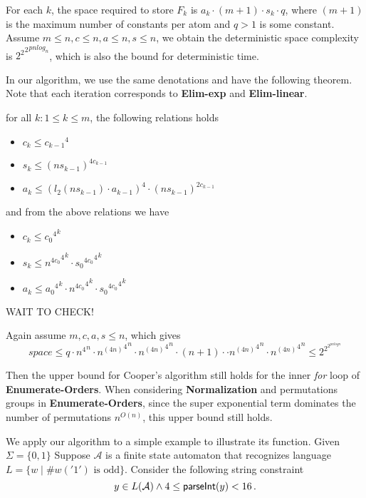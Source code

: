 For each $k$,
the space required to store $F_k$ 
is $a_k \cdot (m+1) \cdot s_k \cdot q$,
where $(m+1)$ is the maximum number of constants per atom and $q>1$ is some constant. Assume $m\le n, c\le n, a\le n, s\le n$, we obtain the deterministic space complexity is ${{2^2}^2}^{p n log_n}$, which is also the bound for deterministic time.

In our algorithm,
we use the same denotations and have the following theorem. 
Note that each iteration corresponds to \textbf{Elim-exp} and \textbf{Elim-linear}.
\begin{theorem}
for all $k: 1\le k\le m$, the following relations holds
\begin{itemize}
    \item $c_k \le {c_{k-1}}^4$
    \item $s_k \le {(n s_{k-1})}^{4c_{k-1}}$
    \item $a_k \le {{(l_2(ns_{k-1})\cdot a_{k-1})}}^4 \cdot {(n s_{k-1})}^{2c_{k-1}}$
\end{itemize}
and from the above relations we have 
\begin{itemize}
    \item $c_k \le {{c_0}^4}^k$
    \item $s_k \le {{{n}^{4c_0}}^4}^k \cdot {{{s_0}^{4c_0}}^4}^k$
    \item $a_k \le {{a_0}^4}^k \cdot 
     {{{n}^{4c_0}}^4}^k
     \cdot {{{s_0}^{4c_0}}^4}^k$
\end{itemize}
\end{theorem}

WAIT TO CHECK!

Again assume $m,c,a,s\le n$, which gives 
$$
\textit{space}\le q \cdot {n^4}^n \cdot {{n^{(4n)}}^4}^n \cdot
{{n^{(4n)}}^4}^n \cdot (n+1) \cdot 
\cdot {{n^{(4n)}}^4}^n \cdot {{n^{(4n)}}^4}^n
\le 2^{2^{2^{p n \textit{log}n}}}
$$

Then the upper bound for Cooper's algorithm still holds for the inner \textit{for} loop of \textbf{Enumerate-Orders}.
When considering \textbf{Normalization} and permutations groups in \textbf{Enumerate-Orders},
since the super exponential term dominates the number of permutations $n^{O(n)}$,
this upper bound still holds.



 

We apply our algorithm to a simple example to 
illustrate its function.
Given $\Sigma = \{0,1\}$
Suppose $\mathcal{A}$ is a finite state automaton
that recognizes language $L = \{ w \mid \#w('1') \text{ is odd}\}$.
Consider the following string constraint
$$y\in L(\mathcal{A})\wedge 4\le  \textsf{parseInt}(y) < 16\,.$$

